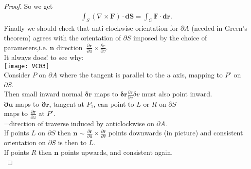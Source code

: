 \documentclass[a4paper]{article}
\begin{document}
\begin{proof}
So we get 
\begin{equation*}
\begin{aligned}
\int_S \left(\nabla\times\mathbf{F}\right)\cdot\mathbf{dS}=\int_C \mathbf{F}\cdot\mathbf{dr}.
\end{aligned}
\end{equation*}
Finally we should check that anti-clockwise orientation for $\partial A$ (needed in Green's theorem) agrees with the orientation of $\partial S$ imposed by the choice of parameters,i.e. $\mathbf{n}$ direction $~ \frac{\partial \mathbf{r}}{\partial u}\times\frac{\partial \mathbf{r}}{\partial v}$.\\
It always does! to see why:\\
\texttt{[image: VC03]}\\
Consider $P$ on $\partial A$ where the tangent is parallel to the $u$ axis, mapping to $P'$ on $\partial S$.\\
Then small inward normal $\mathbf{\delta r}$ maps to $\mathbf{\delta r}\frac{\partial \mathbf{r}}{\partial v}\delta v$ must also point inward.\\
$\mathbf{\partial u}$ maps to $\mathbf{\partial r}$, tangent at $P_1$, can point to $L$ or $R$ on $\partial S$ \\
maps to $\frac{\partial \mathbf{r}}{\partial u}$ at $P'$.\\
=direction of traverse induced by anticlockwise on $\partial A$.\\
If points $L$ on $\partial S$ then $\mathbf{n} \sim \frac{\partial \mathbf{r}}{\partial u}\times\frac{\partial \mathbf{r}}{\partial v}$ points downwards (in picture) and consistent orientation on $\partial S$ is then to $L$.\\
If points $R$ then $\mathbf{n}$ points upwards, and consistent again.\\
\end{proof}

\newpage
\end{document}
